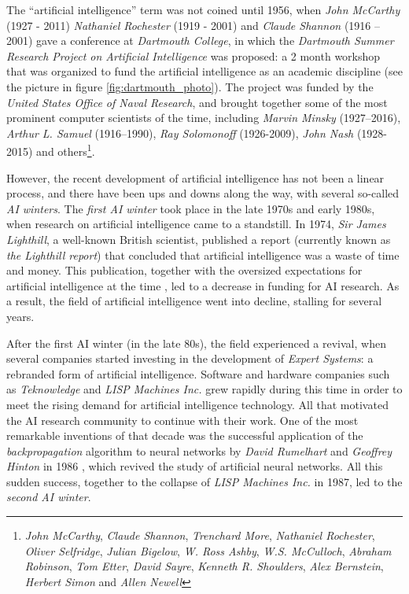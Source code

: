 The ``artificial intelligence'' term was not coined until 1956, when \textit{John McCarthy} (1927 - 2011) \textit{Nathaniel Rochester} (1919 - 2001) and \textit{Claude Shannon} (1916 – 2001) gave a conference at \textit{Dartmouth College}, in which the \textit{Dartmouth Summer Research Project on Artificial Intelligence} was proposed: a 2 month workshop that was organized to fund the artificial intelligence as an academic discipline (see the picture in figure \ref{fig:dartmouth_photo}). The project was funded by the \textit{United States Office of Naval Research}, and brought together some of the most prominent computer scientists of the time, including \textit{Marvin Minsky} (1927–2016), \textit{Arthur L. Samuel} (1916–1990), \textit{Ray Solomonoff} (1926-2009),  \textit{John Nash} (1928-2015) and others\footnote{\textit{John McCarthy}, \textit{Claude Shannon}, \textit{Trenchard More}, \textit{Nathaniel Rochester}, \textit{Oliver Selfridge}, \textit{Julian Bigelow}, \textit{W. Ross Ashby}, \textit{W.S. McCulloch}, \textit{Abraham Robinson}, \textit{Tom Etter},  \textit{David Sayre}, \textit{Kenneth R. Shoulders}, \textit{Alex Bernstein}, \textit{Herbert Simon} and \textit{Allen Newell}}.

However, the recent development of artificial intelligence has not been a linear process, and there have been ups and downs along the way, with several so-called \textit{AI winters}. The \textit{first AI winter} took place in the late 1970s and early 1980s, when research on artificial intelligence came to a standstill. In 1974, \textit{Sir James Lighthill}, a well-known British scientist, published a report \autocite{lighthillReport} (currently known as \textit{the Lighthill report}) that concluded that artificial intelligence was a waste of time and money. This publication, together with the oversized expectations for artificial intelligence at the time \autocite{russellNorvig}, led to a decrease in funding for AI research. As a result, the field of artificial intelligence went into decline, stalling for several years.

After the first AI winter (in the late 80s), the field experienced a revival, when several companies started investing in the development of \textit{Expert Systems}: a rebranded form of artificial intelligence. Software and hardware companies such as \textit{Teknowledge} and \textit{LISP Machines Inc.} grew rapidly during this time in order to meet the rising demand for artificial intelligence technology. All that motivated the AI research community to continue with their work. One of the most remarkable inventions of that decade was the successful application of the \textit{backpropagation} algorithm to neural networks by \textit{David Rumelhart} and \textit{Geoffrey Hinton} in 1986 \autocite{hinton1986}, which revived the study of artificial neural networks. All this sudden success, together to the collapse of \textit{LISP Machines Inc.} in 1987, led to the \textit{second AI winter}.

